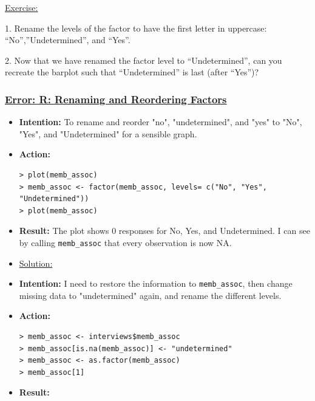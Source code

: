 \documentclass[12pt]{article}
\begin{document}
\vspace{0.5em}
\begin{addmargin}[1cm]{0cm}
\color{gray}
\underline{Exercise:}

1. Rename the levels of the factor to have the first letter in uppercase: “No”,”Undetermined”, and “Yes”.

2. Now that we have renamed the factor level to “Undetermined”, can you recreate the barplot such that “Undetermined” is last (after “Yes”)?

\color{black}\vspace{0.5em}
{\subsubsection{\texorpdfstring{\underline{Error: R: Renaming and Reordering Factors}}{}}\label{error:er20}
\begin{itemize}
    \item \textbf{Intention:} To rename and reorder "no", "undetermined", and "yes" to "No", "Yes", and "Undetermined" for a sensible graph.
    \item \textbf{Action:} \vspace{-1em}\begin{verbatim} 
> plot(memb_assoc)
> memb_assoc <- factor(memb_assoc, levels= c("No", "Yes", "Undetermined"))
> plot(memb_assoc)
    \end{verbatim}
    \item \textbf{Result:} The plot shows 0 responses for No, Yes, and Undetermined. I can see by calling \texttt{memb\_assoc} that every observation is now NA.
\end{itemize}
\begin{itemize}
\renewcommand{\labelitemi}{}
\item \underline{Solution:}
\renewcommand{\labelitemi}{$\bullet$}
      \item \textbf{Intention:} I need to restore the information to \texttt{memb\_assoc}, then change missing data to "undetermined" again, and rename the different levels.
    \item \textbf{Action:} \vspace{-1em}\begin{verbatim}
> memb_assoc <- interviews$memb_assoc
> memb_assoc[is.na(memb_assoc)] <- "undetermined"
> memb_assoc <- as.factor(memb_assoc)
> memb_assoc[1]
      \end{verbatim}\vspace{-2em}
      \item \textbf{Result:} \vspace{-1em}\begin{verbatim}

\end{verbatim}
\end{itemize}}
\end{addmargin}
\end{document}
